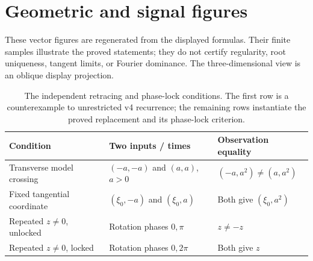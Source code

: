 \documentclass[11pt,a4paper]{article}
\theoremstyle{definition}\newtheorem{definition}[theorem]{Definition}
\theoremstyle{remark}\newtheorem{remark}[theorem]{Remark}
\begin{document}
\section{Geometric and signal figures}
These vector figures are regenerated from the displayed formulas. Their
finite samples illustrate the proved statements; they do not certify
regularity, root uniqueness, tangent limits, or Fourier dominance. The
three-dimensional view is an oblique display projection.
\begin{table}[htp]\centering\small
\begin{tabular}{@{}p{.26\linewidth}p{.34\linewidth}p{.32\linewidth}@{}}
\toprule
Condition & Two inputs / times & Observation equality\\
\midrule
Transverse model crossing & $(-a,-a)$ and $(a,a)$, $a>0$ & $(-a,a^2)\ne(a,a^2)$\\
Fixed tangential coordinate & $(\xi_0,-a)$ and $(\xi_0,a)$ & Both give $(\xi_0,a^2)$\\
Repeated $z\ne0$, unlocked & Rotation phases $0,\pi$ & $z\ne-z$\\
Repeated $z\ne0$, locked & Rotation phases $0,2\pi$ & Both give $z$\\
\bottomrule
\end{tabular}
\caption{The independent retracing and phase-lock conditions. The first
row is a counterexample to unrestricted v4 recurrence; the remaining
rows instantiate the proved replacement and its phase-lock criterion.}
\end{table}
\end{document}

